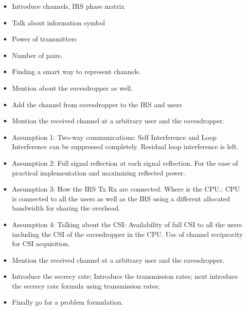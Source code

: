 \documentclass[lettersize,journal]{IEEEtran}
\begin{document}
\begin{itemize}


\item Introduce channels, IRS phase matrix
\item Talk about information symbol
\item Power of transmitters
\item Number of pairs.
\item Finding a smart way to represent channels.

\item Mention about the eavesdropper as well.

\item Add the channel from eavesdropper to the IRS and users

\item Mention the received channel at a arbitrary user and the eavesdropper.

\item Assumption 1: Two-way communications: Self Interference and Loop Interference can be suppressed completely. Residual loop interference is left.

\item Assumption 2: Full signal reflection at each signal reflection. For the ease of practical implementation and maximizing reflected power.

\item Assumption 3: How the IRS Tx Rx are connected. Where is the CPU.: CPU is connected to all the users as well as the IRS using a different allocated bandwidth for sharing the overhead.

\item Assumption 4: Talking about the CSI: Availability of full CSI to all the users including the CSI of the eavesdropper in the CPU. Use of channel reciprocity for CSI acquisition.

\item Mention the received channel at a arbitrary user and the eavesdropper.


\item Introduce the secrecy rate; Introduce the transmission rates; next introduce the secrecy rate formula using transmission rates;




\item Finally go for a problem formulation.

\end{itemize}
\end{document}
